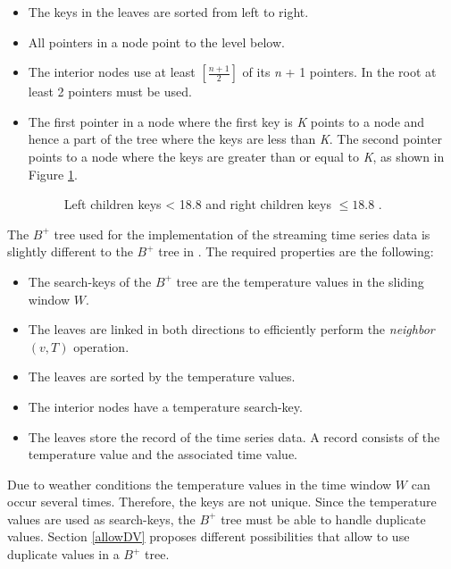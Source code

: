 \documentclass[abstracton,12pt]{scrreprt}
\begin{document}
\begin{itemize}  
	\item The keys in the leaves are sorted from left to right. 
	\item All pointers in a node point to the level below.
	\item The interior nodes use at least $[\frac{n+1}{2}]$ of its \emph{n} + 1 pointers. In the root at least 2 pointers must be used. 
	\item The first pointer in a node where the first key is \emph{K} points to a node and hence a part of the tree where the keys are less than \emph{K}. The second pointer points to a node where the keys are greater than or equal to \emph{K}, as shown in Figure \ref{lessOrEqual}. 
	\begin{figure}[H]
		\centering
		\vspace{2mm}
		\caption{Left children keys < 18.8 and right children keys $\leq 18.8$ .}
		\label{lessOrEqual}
	\end{figure}
\end{itemize}
The $B^+$ tree used for the implementation of the streaming time series data is slightly different to the  $B^+$ tree in \cite{BTreeBook}. The required properties are the following: \\
\begin{itemize}  
	\item The search-keys of the $B^+$ tree are the temperature values in the sliding window $W$.
	\item The leaves are linked in both directions to efficiently perform the \emph{neighbor}$(v,T)$ operation.
	\item The leaves are sorted by the temperature values.
	\item The interior nodes have a temperature search-key.
	\item The leaves store the record of the time series data. A record consists of the temperature value and the associated time value.\\ 
\end{itemize}
Due to weather conditions the temperature values in the time window $W$ can occur several times. Therefore, the keys are not unique. Since the temperature values are used as search-keys, the $B^+$ tree must be able to handle duplicate values. Section \ref{allowDV} proposes different possibilities that allow to use duplicate values in a $B^+$ tree. 
\end{document}
